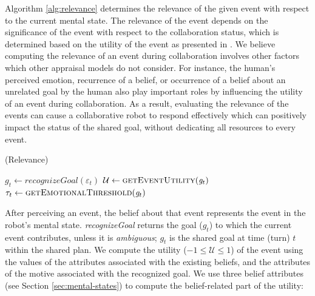 \documentclass{article}
\begin{document}
Algorithm \ref{alg:relevance} determines the relevance of the given event with
respect to the current mental state. The relevance of the event depends on the
significance of the event with respect to the collaboration status, which is
determined based on the utility of the event as presented in
\cite{gratch:domain-independent,marsella:ema-process-model}. We believe
computing the relevance of an event during collaboration involves other factors
which other appraisal models do not consider. For instance, the human's
perceived emotion, recurrence of a belief, or occurrence of a belief about an
unrelated goal by the human also play important roles by influencing the utility
of an event during collaboration. As a result, evaluating the relevance of the
events can cause a collaborative robot to respond effectively which can
positively impact the status of the shared goal, without dedicating all
resources to every event.

\begin{algorithm}
	\caption{(Relevance)}
	\label{alg:relevance}
	\begin{algorithmic}[1]
			\State $\mathit{g}_{t} \gets \textit{recognizeGoal}{(\varepsilon_t)}$
			\State $\mathcal{U} \gets \Call{getEventUtility}{\mathit{g}_{t}}$ 
			\State $\tau_{t} \gets \Call{getEmotionalThreshold}{\mathit{g}_{t}}$
				\State {}
			\Else
				\State {}
			\EndIf
		\EndFunction
	\end{algorithmic}
\end{algorithm}

\vspace*{-3mm}
After perceiving an event, the belief about that event represents the event in
the robot's mental state. \textit{recognizeGoal} returns the goal ($g_{t}$) to
which the current event contributes, unless it is \textit{ambiguous}; $g_{t}$
is the shared goal at time (turn) $t$ within the shared plan. We compute the
utility ($-1 \leq \mathcal{U} \leq 1$) of the event using the values of the
attributes associated with the existing beliefs, and the attributes of the
motive associated with the recognized goal. We use three belief attributes (see
Section \ref{sec:mental-states}) to compute the belief-related part of the
utility:
\end{document}

